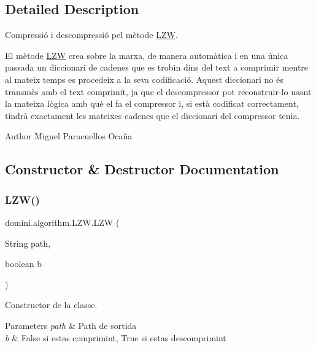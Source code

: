 \subsection{Detailed Description}
Compressió i descompressió pel mètode \hyperlink{classdomini_1_1algorithm_1_1LZW}{L\+ZW}. 

El mètode \hyperlink{classdomini_1_1algorithm_1_1LZW}{L\+ZW} crea sobre la marxa, de manera automàtica i en una única passada un diccionari de cadenes que es trobin dins del text a comprimir mentre al mateix temps es procedeix a la seva codificació. Aquest diccionari no és transmès amb el text comprimit, ja que el descompressor pot reconstruir-\/lo usant la mateixa lògica amb què el fa el compressor i, si està codificat correctament, tindrà exactament les mateixes cadenes que el diccionari del compressor tenia. \begin{DoxyAuthor}{Author}
Miguel Paracuellos Ocaña 
\end{DoxyAuthor}


\subsection{Constructor \& Destructor Documentation}
\mbox{\label{classdomini_1_1algorithm_1_1LZW_ab596afb13b224da41ee590a08df642a9}} 
\subsubsection{\texorpdfstring{L\+Z\+W()}{LZW()}\hspace{0.1cm}{\footnotesize\ttfamily [1/2]}}
{\footnotesize\ttfamily domini.\+algorithm.\+L\+Z\+W.\+L\+ZW (\begin{DoxyParamCaption}\item[{String}]{path,  }\item[{boolean}]{b }\end{DoxyParamCaption})\hspace{0.3cm}{\ttfamily [inline]}}



Constructor de la classe. 


\begin{DoxyParams}{Parameters}
{\em path} & Path de sortida \\
\hline
{\em b} & False si estas comprimint, True si estas descomprimint \\
\hline
\end{DoxyParams}

